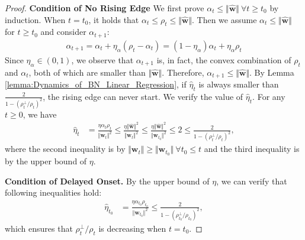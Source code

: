\documentclass[pdflatex,sn-basic]{sn-jnl}%
\theoremstyle{thmstyleone}%
\begin{document}
\begin{appendices}
\begin{proof}
\noindent\textbf{Condition of No Rising Edge} 
We first prove $\alpha_t \le \Vert \hat{\mathbf{w}} \Vert \ \forall t \ge t_0$ by induction. 
When $t = t_0$, it holds that $\alpha_t \le \rho_t \le \Vert \hat{\mathbf{w}} \Vert$. 
Then we assume $\alpha_t \le \Vert \hat{\mathbf{w}} \Vert$ for $t \ge t_0$ and consider $\alpha_{t+1}$:
\begin{equation*}
\begin{aligned}
  \alpha_{t+1} = \alpha_{t} + \eta_{\alpha} \left( \rho_t - \alpha_t \right) = 
  \left(1 - \eta_{\alpha}\right) \alpha_t + \eta_\alpha \rho_t
\end{aligned}
\end{equation*}
Since $\eta_{\alpha} \in (0, 1)$, we observe that $\alpha_{t+1}$ is, in fact, the convex combination of 
$\rho_t$ and $\alpha_t$, both of which are smaller than $\Vert \hat{\mathbf{w}} \Vert$. 
Therefore, $\alpha_{t+1} \le \Vert \hat{\mathbf{w}} \Vert$. 
By Lemma \ref{lemma:Dynamics_of_BN_Linear_Regression}, if 
$\hat{\eta}_{t}$ is always smaller than $\frac{2}{1 - (\rho_t^{\perp} / \rho_t)^2}$, 
the rising edge can never start. We verify the value of $\hat{\eta}_{t}$. 
For any $t \ge 0$, we have 
\begin{equation*}
\begin{aligned}
  \hat{\eta}_{t} & = 
  \frac{\eta \alpha_{t} \rho_{t}}{\Vert \mathbf{w}_{t} \Vert^{2}} 
  \le 
  \frac{\eta \Vert \hat{\mathbf{w}} \Vert^2}{\Vert \mathbf{w}_{t} \Vert^{2}} 
  \le 
  \frac{\eta \Vert \hat{\mathbf{w}} \Vert^2}{\Vert \mathbf{w}_{t_0} \Vert^{2}} 
  \le 
  2
  \le \frac{2}{1 - \left(\rho_{t}^{\perp}/\rho_{t}\right)^2},
\end{aligned}
\end{equation*}
where the second inequality is by $\Vert \mathbf{w}_{t} \Vert \ge \Vert \mathbf{w}_{t_0} \Vert \ \forall t_0 \le t$ 
and the third inequality is by the upper bound of $\eta$. 

\noindent\textbf{Condition of Delayed Onset.}
  By the upper bound of $\eta$, we can verify that following inequalities hold:
  \begin{equation*}
  \begin{aligned}
    \hat{\eta}_{t_0} & = 
    \frac{\eta \alpha_{t_0} \rho_{t_0}}{\Vert \mathbf{w}_{t_0} \Vert^{2}} 
    \le 
    \frac{2}{1 - \left(\rho_{t_0}^{\perp}/\rho_{t_0}\right)^2},
  \end{aligned}
  \end{equation*}
  which ensures that $\rho_t^{\perp} / \rho_t$ is decreasing when $t = t_0$. 


\end{proof}
\end{appendices}
\end{document}
